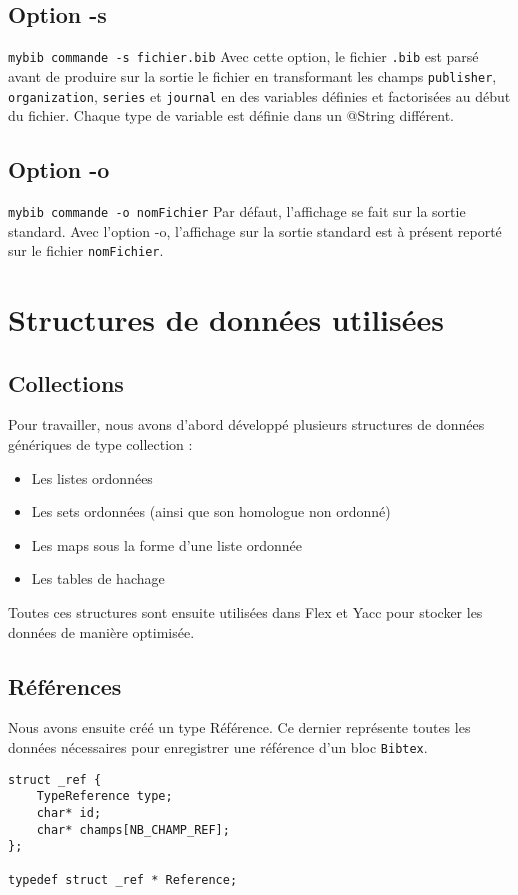 \documentclass[hidelinks, a4paper,11pt,twoside,final]{article}
\begin{document}
\subsection{Option -s}
\texttt{mybib commande -s fichier.bib}
\newline
Avec cette option, le fichier \texttt{.bib} est parsé avant de produire sur la sortie
le fichier en transformant les champs \texttt{publisher}, \texttt{organization}, \texttt{series} et  \texttt{journal}
en des variables définies et factorisées au début du fichier. 
Chaque type de variable est définie dans un @String différent.

\subsection{Option -o}
\texttt{mybib commande -o nomFichier}
\newline
Par défaut, l'affichage se fait sur la sortie standard. 
Avec l'option -o, l'affichage sur la sortie standard est à présent reporté sur le fichier \texttt{nomFichier}.


\section{Structures de données utilisées}
\subsection{Collections}
Pour travailler, nous avons d'abord développé plusieurs structures de données génériques de type collection :
\begin{itemize}
 \item Les listes ordonnées 
 \item Les sets ordonnées (ainsi que son homologue non ordonné)
 \item Les maps sous la forme d'une liste ordonnée 
 \item Les tables de hachage
\end{itemize}
Toutes ces structures sont ensuite utilisées dans Flex et Yacc pour stocker les données de manière optimisée.

\subsection{Références}
Nous avons ensuite créé un type Référence. Ce dernier représente toutes les données nécessaires pour enregistrer une référence d'un bloc \texttt{Bibtex}.
\begin{lstlisting}
struct _ref {
    TypeReference type;
    char* id;
    char* champs[NB_CHAMP_REF];
};

typedef struct _ref * Reference;
\end{lstlisting}
\end{document}
